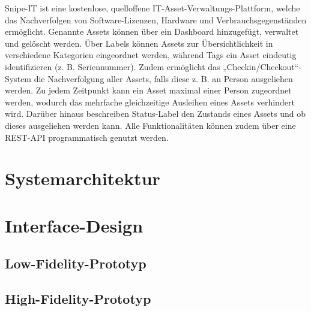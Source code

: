 Snipe-IT ist eine kostenlose, quelloffene IT-Asset-Verwaltungs-Plattform,
welche das Nachverfolgen von Software-Lizenzen, Hardware und
Verbrauchsgegenständen ermöglicht. Genannte Assets können über ein Dashboard
hinzugefügt, verwaltet und gelöscht werden. Über Labels können Assets zur
Übersichtlichkeit in verschiedene Kategorien eingeordnet werden, während
Tags ein Asset eindeutig identifizieren (z. B. Seriennummer). Zudem ermöglicht
das „Checkin/Checkout“-System die Nachverfolgung aller Assets, falls diese
z. B.  an Person ausgeliehen werden. Zu jedem Zeitpunkt kann ein Asset
maximal einer Person zugeordnet werden, wodurch das mehrfache gleichzeitige
Ausleihen eines Assets verhindert wird. Darüber hinaus beschreiben Status-Label
den Zustands eines Assets und ob dieses ausgeliehen werden kann. Alle
Funktionalitäten können zudem über eine REST-API programmatisch genutzt werden.


\section{Systemarchitektur}

\section{Interface-Design}

\subsection{Low-Fidelity-Prototyp}

\subsection{High-Fidelity-Prototyp}
